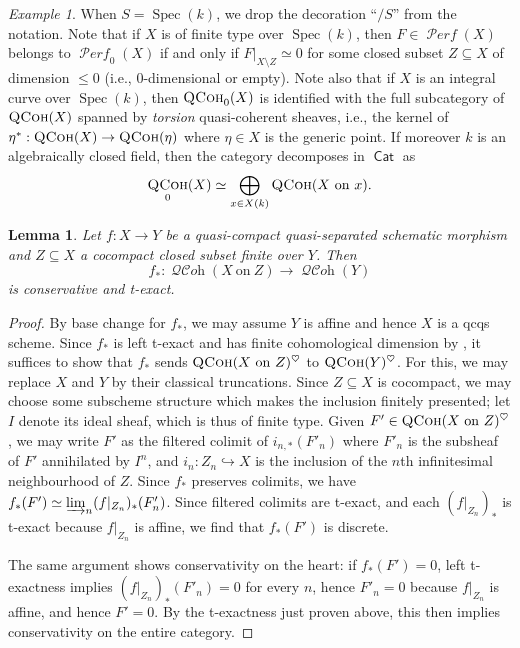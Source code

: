 \documentclass[12pt, oneside]{amsart}
\numberwithin{equation}{section}
\newtheorem{lemma}[subsubsection]{Lemma}
\theoremstyle{remark}
\newtheorem{example}[subsubsection]{Example}
\theoremstyle{plain}
\renewcommand{\le}{\leqslant}
\newcommand{\Cat}{\operatorname{\mathsf{Cat}}}
\DeclareMathOperator{\QCoh}{\textsc{QCoh}}
\DeclareMathOperator{\QCOH}{\mathcal{QC}\textit{oh}}
\DeclareMathOperator{\PERF}{\mathcal{P}\textit{erf}}
\DeclareMathOperator{\spc}{Spec}
\begin{document}
\begin{example} When $S=\spc(k)$, we drop the decoration ``$/S$'' from the notation. Note that if $X$ is of finite type over $\spc(k)$, then $F \in \PERF(X)$ belongs to $\PERF_0(X)$ if and only if $F|_{X\setminus Z} \simeq 0$ for some closed subset $Z \subseteq X$ of dimension $\le 0$ (i.e., $0$-dimensional or empty). Note also that if $X$ is an integral curve over $\spc(k)$, then $\QCoh_0(X)$ is identified with the full subcategory of $\QCoh(X)$ spanned by \emph{torsion} quasi-coherent sheaves, i.e., the kernel of $\eta^* : \QCoh(X) \to \QCoh(\eta)$ where $\eta \in X$ is the generic point. If moreover $k$ is an algebraically closed field, then the category decomposes in $\Cat$ as $$\QCoh_0(X) \simeq \bigoplus_{x\in X(k)} \QCoh(X~\mathrm{on}~x).$$ \end{example}

\begin{lemma}\label{lem:push finite support}
Let $f : X \to Y$ be a quasi-compact quasi-separated schematic morphism and $Z\subseteq X$ a cocompact closed subset finite over $Y$.
Then
\[
  f_*:\QCOH(X~\mathrm{on}~Z)\to\QCOH(Y)
\]
is conservative and t-exact.
\end{lemma}
\begin{proof}
By base change for $f_*$, we may assume $Y$ is affine and hence $X$ is a qcqs scheme.
Since $f_*$ is left t-exact and has finite cohomological dimension by \cite[Cor.~3.4.2.3]{SAG}, it suffices to show that $f_*$ sends $\QCoh(X~\mathrm{on}~Z)^\heartsuit$ to $\QCoh(Y)^\heartsuit$.
For this, we may replace $X$ and $Y$ by their classical truncations.
Since $Z \subseteq X$ is cocompact, we may choose some subscheme structure which makes the inclusion finitely presented; let $I$ denote its ideal sheaf, which is thus of finite type.
Given $F' \in \QCoh(X~\mathrm{on}~Z)^\heartsuit$, we may write $F'$ as the filtered colimit of $i_{n,*}(F'_n)$ where $F'_{n}$ is the subsheaf of $F'$ annihilated by $I^n$, and $i_n : Z_n \hookrightarrow X$ is the inclusion of the $n$th infinitesimal neighbourhood of $Z$.
Since $f_*$ preserves colimits, we have $f_*(F') \simeq \varinjlim_n (f|_{Z_n})_*(F'_n)$.
Since filtered colimits are t-exact, and each $(f|_{Z_n})_*$ is t-exact because $f|_{Z_n}$ is affine, we find that $f_*(F')$ is discrete.

The same argument shows conservativity on the heart: if $f_*(F')=0$, left t-exactness implies $(f|_{Z_n})_*(F'_n)=0$ for every $n$, hence $F'_n=0$ because $f|_{Z_n}$ is affine, and hence $F'=0$.
By the t-exactness just proven above, this then implies conservativity on the entire category.
\end{proof}
\end{document}
